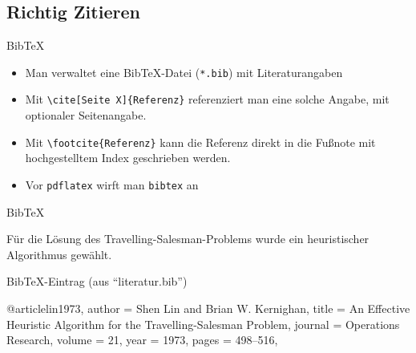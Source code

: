 \documentclass{beamer}
\begin{document}
		
		\subsection{Richtig Zitieren}
		
		\begin{frame}[containsverbatim]{Bib\TeX}
			\begin{itemize}
				\item Man verwaltet eine Bib\TeX{}-Datei (\texttt{*.bib}) mit Literaturangaben
				\item Mit \texttt{\textbackslash{}cite[Seite X]\{Referenz\}} referenziert man eine solche Angabe, mit optionaler Seitenangabe.
				\item Mit \texttt{\textbackslash{}footcite\{Referenz\}} kann die Referenz direkt in die Fußnote mit hochgestelltem Index geschrieben werden.
				\item Vor \texttt{pdflatex} wirft man \texttt{bibtex} an
			\end{itemize}
		\end{frame}
		
		
		\begin{frame}[containsverbatim]{Bib\TeX}
			\begin{latexcode}


Für die Lösung des Travelling-Salesman-Problems
wurde ein heuristischer Algorithmus \cite{lin19973}
gewählt.


			\end{latexcode}
		\end{frame}
		
		
		\begin{frame}[containsverbatim]{Bib\TeX-Eintrag}
			 (aus ``literatur.bib'')
			\begin{latexcode}
@article{lin1973,
	author  = {Shen Lin and Brian W. Kernighan},
	title   = {An Effective Heuristic Algorithm for the
	           Travelling-Salesman Problem},
	journal = {Operations Research},
	volume  = {21},
	year    = {1973},
	pages   = {498--516},
}
			\end{latexcode}
		\end{frame}
		
\end{document}

